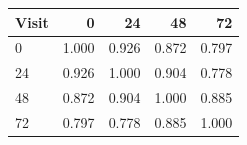 \small
\begin{tabular}{lrrrr}
\hline
Visit & 0 & 24 & 48 & 72 \\
\hline
0 & 1.000 & 0.926 & 0.872 & 0.797 \\
24 & 0.926 & 1.000 & 0.904 & 0.778 \\
48 & 0.872 & 0.904 & 1.000 & 0.885 \\
72 & 0.797 & 0.778 & 0.885 & 1.000 \\
\hline
\end{tabular}
